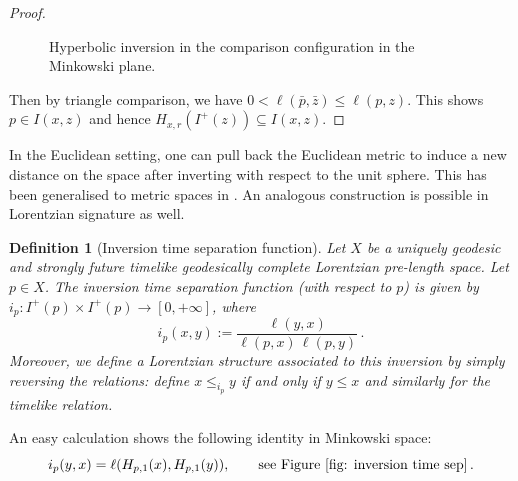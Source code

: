 \documentclass[hidelinks,12pt,a4paper]{article}
\numberwithin{equation}{section}
\theoremstyle{plain}
\newtheorem{definition}{Definition}[section]
\theoremstyle{definition}
\newcommand{\LpLSn}{Lo\-rentz\-ian pre-length space}
\newcommand*{\bz}{\bar{z}}
\newcommand*{\bp}{\bar{p}}
\newcommand*{\bq}{\bar{q}}
\begin{document}
\begin{proof}
\begin{figure}
\begin{center}
\end{center}
\caption{Hyperbolic inversion in the comparison configuration in the Minkowski plane.}
\label{fig: CAT inversion}
\end{figure}
Then by triangle comparison, we have $0 <\ell(\bp,\bz) \leq \ell(p,z)$. 
This shows $p \in I(x,z)$ and hence $H_{x,r}(I^+(z)) \subseteq I(x,z)$. 
\end{proof}

In the Euclidean setting, one can pull back the Euclidean metric to induce a new distance on the space after inverting with respect to the unit sphere. 
This has been generalised to metric spaces in \cite{BHX08}. 
An analogous construction is possible in Lorentzian signature as well. 

\begin{definition}[Inversion time separation function]
Let $X$ be a uniquely geodesic and strongly future timelike geodesically complete \LpLSn. 
Let $p \in X$. 
The inversion time separation function (with respect to $p$) is given by $i_p: I^+(p) \times I^+(p) \to [0,+\infty]$, where
\begin{equation}
\label{eq: inversion ell}
    i_p(x,y) := \frac{\ell(y,x)}{\ell(p,x) \, \ell(p,y)} \, .
\end{equation} 
Moreover, we define a Lorentzian structure associated to this inversion by simply reversing the relations: define $x \leq_{i_p} y$ if and only if $y \leq x$ and similarly for the timelike relation. 
\end{definition}

An easy calculation shows the following identity in Minkowski space: 
\[
i_p(y,x)=\ell(H_{p,1}(x),H_{p,1}(y)), \qquad\text{see  Figure \ref{fig: inversion time sep}} \, 
. \]
\end{document}
